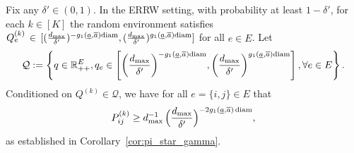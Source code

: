 \documentclass[a4paper, 11pt]{article}
\renewcommand{\P}{\mathbb{P}}
\newcommand{\Psrw}{\P_{\textnormal{srw}}}
\newcommand{\diam}{\textnormal{diam}}
\begin{document}
Fix any $\delta'\in(0,1)$. In the ERRW setting, with probability at least $1 -\delta'$, 
for each $k \in [K]$ the random environment satisfies $ Q_e^{(k)} \,\in\, [(\frac{d_{\max}}{\delta'})^{-g_1(\underline{a},\overline{a})\diam}, (\frac{d_{\max}}{\delta'})^{g_1(\underline{a},\overline{a})\diam}]$ for all $e \in E$. 
Let
\begin{equation}     
\label{eqn:errw-goodQset}
\mathcal{Q}
:=\left\{
q\in\mathbb{R}_{++}^E, 
q_e\in 
\left[
\bigg(\frac{d_{\max}}{\delta'}\bigg)^{-g_1(\underline{a},\overline{a})\diam}, 
\bigg(\frac{d_{\max}}{\delta'}\bigg)^{g_1(\underline{a},\overline{a})\diam}
\right], 
\forall e\in E
\right\}. 
\end{equation}
Conditioned on $Q^{(k)} \in \mathcal{Q}$,
we have for all $e=\{i,j\} \in E$ that
\begin{equation}
\label{eqn:errw-pij_bound1}
P_{ij}^{(k)} \ge d_{\max}^{-1}\,\Big(\frac{d_{\max}}{\delta'}\Big)^{-2g_1(\underline{a},\overline{a})\,\diam},
\end{equation}
as established in Corollary~\ref{cor:pi_star_gamma}.

\end{document}
